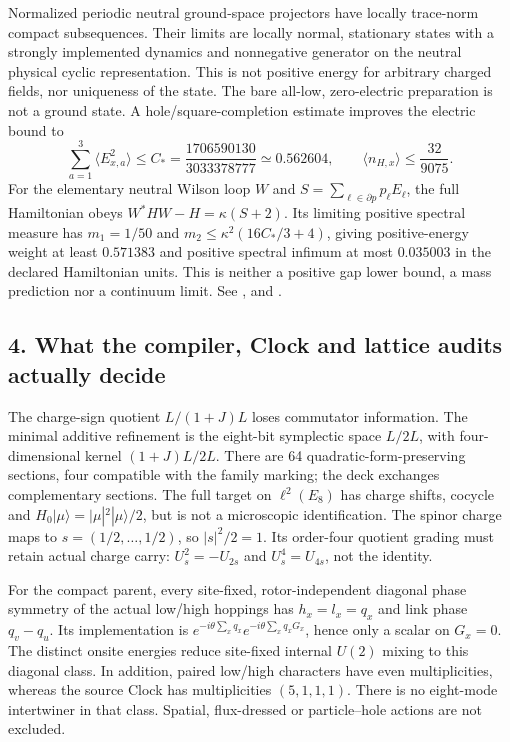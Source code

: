 Normalized periodic neutral ground-space projectors have locally
trace-norm compact subsequences. Their limits are locally normal,
stationary states with a strongly implemented dynamics and nonnegative
generator on the neutral physical cyclic representation. This is not
positive energy for arbitrary charged fields, nor uniqueness of the state.
The bare all-low, zero-electric preparation is not a ground state.
A hole/square-completion estimate improves the electric bound to
\[
 \sum_{a=1}^3\langle E_{x,a}^2\rangle\leq C_*=
 \frac{1706590130}{3033378777}\simeq0.562604,
 \qquad \langle n_{H,x}\rangle\leq\frac{32}{9075}.
\]
For the elementary neutral Wilson loop $W$ and
$S=\sum_{\ell\in\partial p}p_\ell E_\ell$, the full Hamiltonian obeys
$W^*HW-H=\kappa(S+2)$. Its limiting positive spectral measure has
$m_1=1/50$ and $m_2\leq\kappa^2(16C_*/3+4)$, giving positive-energy
weight at least $0.571383$ and positive spectral infimum at most
$0.035003$ in the declared Hamiltonian units. This is neither a positive
gap lower bound, a mass prediction nor a continuum limit.
See ,  and
.

\subsection*{4. What the compiler, Clock and lattice audits actually decide}
The charge-sign quotient $L/(1+J)L$ loses commutator information.
The minimal additive refinement is the eight-bit symplectic space
$L/2L$, with four-dimensional kernel $(1+J)L/2L$.
There are 64 quadratic-form-preserving sections, four compatible with
the family marking; the deck exchanges complementary sections.
The full target on $\ell^2(E_8)$ has charge shifts, cocycle and
$H_0|\mu\rangle=|\mu|^2|\mu\rangle/2$, but is not a microscopic
identification. The spinor charge maps to
$s=(1/2,\ldots,1/2)$, so $|s|^2/2=1$.
Its order-four quotient grading must retain actual charge carry:
$U_s^2=-U_{2s}$ and $U_s^4=U_{4s}$, not the identity.

For the compact parent, every site-fixed, rotor-independent diagonal
phase symmetry of the actual low/high hoppings has
$h_x=l_x=q_x$ and link phase $q_v-q_u$. Its implementation is
$e^{-i\theta\sum_xq_x}e^{-i\theta\sum_xq_xG_x}$, hence only a scalar
on $G_x=0$. The distinct onsite energies reduce site-fixed internal
$U(2)$ mixing to this diagonal class. In addition, paired low/high
characters have even multiplicities, whereas the source Clock has
multiplicities $(5,1,1,1)$. There is no eight-mode intertwiner in that
class. Spatial, flux-dressed or particle--hole actions are not excluded.

